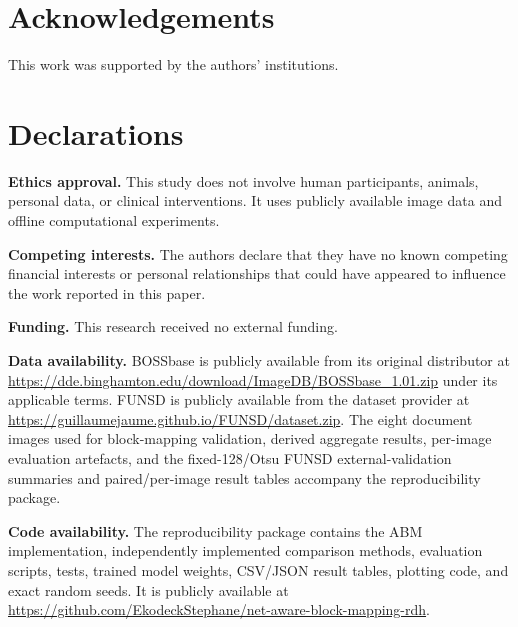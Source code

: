\RevisionAddEnd

\section*{Acknowledgements}
\RevisionAddBegin
This work was supported by the authors' institutions.
\RevisionAddEnd

\printcredits

\section*{Declarations}
\noindent\textbf{Ethics approval.}
This study does not involve human participants, animals, personal data, or
clinical interventions. It uses publicly available image data and offline
computational experiments.

\medskip
\noindent\textbf{Competing interests.}
The authors declare that they have no known competing financial interests or
\RevisionAddBegin
personal relationships that could have appeared to influence the work reported
in this paper.
\RevisionAddEnd

\medskip
\noindent\textbf{Funding.}
This research received no external funding.

\medskip
\noindent\textbf{Data availability.}
\RevisionAddBegin
BOSSbase is publicly available from its original distributor at
\url{https://dde.binghamton.edu/download/ImageDB/BOSSbase_1.01.zip} under its
applicable terms. FUNSD is publicly available from the dataset provider at
\url{https://guillaumejaume.github.io/FUNSD/dataset.zip}. The eight document
images used for block-mapping validation, derived aggregate results, per-image
evaluation artefacts, and the fixed-128/Otsu FUNSD external-validation
summaries and paired/per-image result tables accompany the reproducibility
package.
\RevisionAddEnd

\medskip
\noindent\textbf{Code availability.}
The reproducibility package contains the ABM implementation, independently
implemented comparison methods, evaluation scripts, tests, trained model
weights, CSV/JSON result tables, plotting code, and exact random seeds. It is
publicly available at
\url{https://github.com/EkodeckStephane/net-aware-block-mapping-rdh}.

